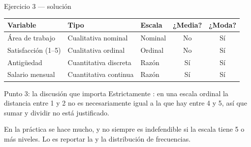 \documentclass[aspectratio=169,10pt]{beamer}
\begin{document}
\begin{frame}{Ejercicio 3 — solución}
  \scriptsize
  \begin{center}
  \begin{tabular}{@{}lllcc@{}}
    \toprule
    \textbf{Variable} & \textbf{Tipo} & \textbf{Escala} &
    \textbf{¿Media?} & \textbf{¿Moda?} \\
    \midrule
    Área de trabajo      & Cualitativa nominal   & Nominal & No & Sí \\
    Satisfacción (1--5)  & Cualitativa ordinal   & Ordinal & No & Sí \\
    Antigüedad           & Cuantitativa discreta & Razón   & Sí & Sí \\
    Salario mensual      & Cuantitativa continua & Razón   & Sí & Sí \\
    \bottomrule
  \end{tabular}
  \end{center}

  \vspace{0.2cm}
  \begin{alertblock}{Punto 3: la discusión que importa}
    \footnotesize
    Estrictamente : en una escala ordinal la distancia
    entre 1 y 2 no es necesariamente igual a la que hay entre 4 y 5, así que
    sumar y dividir no está justificado.

    En la práctica se hace mucho, y no siempre es indefendible si la escala
    tiene 5 o más niveles. Lo  es reportar la  y la
    distribución de frecuencias.
  \end{alertblock}
\end{frame}
\end{document}
